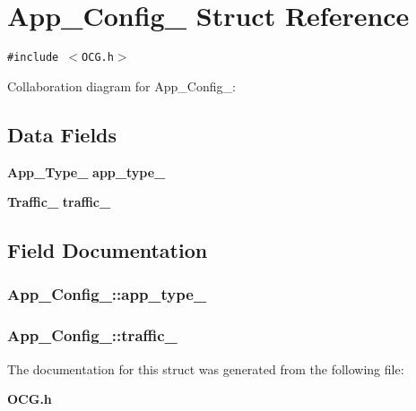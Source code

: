 \section{App\_\-Config\_\- Struct Reference}
\label{structApp__Config__}
{\tt \#include $<$OCG.h$>$}

Collaboration diagram for App\_\-Config\_\-:\subsection*{Data Fields}
\begin{CompactItemize}
\item 
{\bf App\_\-Type\_\-} {\bf app\_\-type\_\-}
\item 
{\bf Traffic\_\-} {\bf traffic\_\-}
\end{CompactItemize}


\subsection{Field Documentation}
\subsubsection[{app\_\-type\_\-}]{ {\bf App\_\-Config\_\-::app\_\-type\_\-}}\label{structApp__Config___ea44b0213fdd7ebca1c2cc106163c759}


\subsubsection[{traffic\_\-}]{ {\bf App\_\-Config\_\-::traffic\_\-}}\label{structApp__Config___d3ee2600adf29e5aa9749fd846dd5bb9}




The documentation for this struct was generated from the following file:\begin{CompactItemize}
\item 
{\bf OCG.h}\end{CompactItemize}
